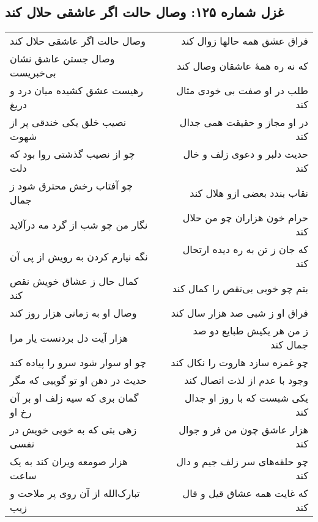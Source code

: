 \begin{center}
\section*{غزل شماره ۱۲۵: وصال حالت اگر عاشقی حلال کند}
\label{sec:125}
\begin{longtable}{l p{0.5cm} r}
وصال حالت اگر عاشقی حلال کند
&&
فراق عشق همه حالها زوال کند
\\
وصال جستن عاشق نشان بی‌خبریست
&&
که نه ره همهٔ عاشقان وصال کند
\\
رهیست عشق کشیده میان درد و دریغ
&&
طلب در او صفت بی خودی مثال کند
\\
نصیب خلق یکی خندقی پر از شهوت
&&
در او مجاز و حقیقت همی جدال کند
\\
چو از نصیب گذشتی روا بود که دلت
&&
حدیث دلبر و دعوی زلف و خال کند
\\
چو آفتاب رخش محترق شود ز جمال
&&
نقاب بندد بعضی ازو هلال کند
\\
نگار من چو شب از گرد مه درآلاید
&&
حرام خون هزاران چو من حلال کند
\\
نگه نیارم کردن به رویش از پی آن
&&
که جان ز تن به ره دیده ارتحال کند
\\
کمال حال ز عشاق خویش نقص کند
&&
بتم چو خوبی بی‌نقص را کمال کند
\\
وصال او به زمانی هزار روز کند
&&
فراق او ز شبی صد هزار سال کند
\\
هزار آیت دل بردنست یار مرا
&&
ز من هر یکیش طبایع دو صد جمال کند
\\
چو او سوار شود سرو را پیاده کند
&&
چو غمزه سازد هاروت را نکال کند
\\
حدیث در دهن او تو گوییی که مگر
&&
وجود با عدم از لذت اتصال کند
\\
گمان بری که سیه زلف او بر آن رخ او
&&
یکی شبست که با روز او جدال کند
\\
زهی بتی که به خوبی خویش در نفسی
&&
هزار عاشق چون من فر و جوال کند
\\
هزار صومعه ویران کند به یک ساعت
&&
چو حلقه‌های سر زلف جیم و دال کند
\\
تبارک‌الله از آن روی پر ملاحت و زیب
&&
که غایت همه عشاق قیل و قال کند
\\
\end{longtable}
\end{center}
